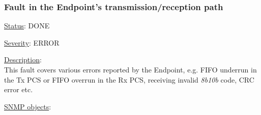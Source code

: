 \subsubsection{\bf Fault in the Endpoint's transmission/reception path}
		\label{fail:data:ep_txrx}
		\begin{packed_enum}
			\item [] \underline{Status}: DONE
			\item [] \underline{Severity}: ERROR
			\item [] \underline{Description}:\\
				This fault covers various errors reported by the Endpoint, e.g. FIFO
				underrun in the Tx PCS or FIFO overrun in the Rx PCS, receiving invalid
				\emph{8b10b} code, CRC error etc.
			\item [] \underline{SNMP objects}:\\
				\\
				\\
				\\
				\\
				\\
				\\
		\end{packed_enum}

